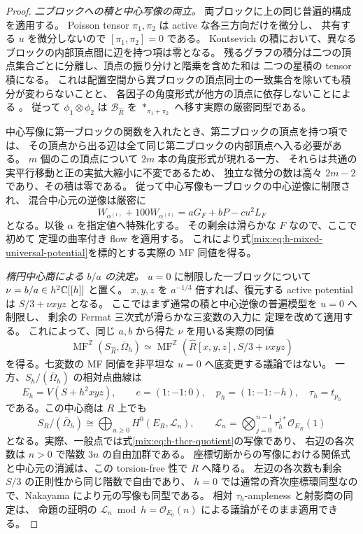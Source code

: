 \begin{proof}
\emph{二ブロックへの積と中心写像の両立。}
両ブロックに上の同じ普遍的構成を適用する。
Poisson tensor $\pi_1,\pi_2$ は active な各三方向だけを微分し、
共有する $u$ を微分しないので $[\pi_1,\pi_2]=0$ である。
Kontsevich の積において、異なるブロックの内部頂点間に辺を持つ項は零となる。
残るグラフの積分は二つの頂点集合ごとに分離し、頂点の振り分けと階乗を含めた和は
二つの星積の tensor 積になる。
これは配置空間から異ブロックの頂点同士の一致集合を除いても積分が変わらないことと、
各因子の角度形式が他方の頂点に依存しないことによる
\cite[Sections~6.2--6.4]{PKontsevich}。
従って $\phi_1\otimes\phi_2$ は $\mathscr B_{\widehat R}$ を
$*_{\pi_1+\pi_2}$ へ移す実際の厳密同型である。

中心写像に第一ブロックの関数を入れたとき、第二ブロックの頂点を持つ項では、
その頂点から出る辺は全て同じ第二ブロックの内部頂点へ入る必要がある。
$m$ 個のこの頂点について $2m$ 本の角度形式が現れる一方、
それらは共通の実平行移動と正の実拡大縮小に不変であるため、
独立な微分の数は高々 $2m-2$ であり、その積は零である。
従って中心写像も一ブロックの中心逆像に制限され、
混合中心元の逆像は厳密に
\begin{equation}\label{mix:eq:h-mixed-universal-potential}
 W_{\alpha^{(1)}}+100W_{\alpha^{(2)}}
   =aG_F+bP-c u^2L_F
\end{equation}
となる。以後 $\alpha$ を指定値へ特殊化する。
その剰余は滑らかな $F$ なので、ここで初めて
定理の曲率付き flow を適用する。
これにより式\eqref{mix:eq:h-mixed-universal-potential}を標的とする実際の MF 同値を得る。

\emph{楕円中心商による $b/a$ の決定。}
$u=0$ に制限した一ブロックについて
$\nu=b/a\in h^2\mathbb C[[h]]$ と置く。
$x,y,z$ を $a^{-1/3}$ 倍すれば、復元する active potential は $S/3+\nu xyz$ となる。
ここではまず通常の積と中心逆像の普遍模型を $u=0$ へ制限し、
剰余の Fermat 三次式が滑らかな三変数の入力に
定理を改めて適用する。
これによって、同じ $a,b$ から得た $\nu$ を用いる実際の同値
\[
 \operatorname{MF}^{\mathbb Z}(S_{\widehat R},\overline\Omega_h)
 \simeq
 \operatorname{MF}^{\mathbb Z}(\widehat R[x,y,z],S/3+\nu xyz)
\]
を得る。七変数の MF 同値を非平坦な $u=0$ へ底変更する議論ではない。
一方、$S_h/(\overline\Omega_h)$ の相対点曲線は
\[
 E_h=V(S+h^2xyz),\qquad
 e=(1:-1:0),\quad p_h=(1:-1:-h),\quad\tau_h=t_{p_h}
\]
である。この中心商は $R$ 上でも
\[
 S_R/(\overline\Omega_h)
 \cong\bigoplus_{n\ge0}H^0(E_R,\mathcal L_n),\qquad
 \mathcal L_n=\bigotimes_{j=0}^{n-1}\tau_h^{j*}\mathcal O_{E_R}(1)
\]
となる。実際、一般点では式\eqref{mix:eq:h-thcr-quotient}の写像であり、
右辺の各次数は $n>0$ で階数 $3n$ の自由加群である。
座標切断からの写像における関係式と中心元の消滅は、この torsion-free 性で $R$ へ降りる。
左辺の各次数も剰余 $S/3$ の正則性から同じ階数で自由であり、
$h=0$ では通常の斉次座標環同型なので、Nakayama により元の写像も同型である。
相対 $\tau_h$-ampleness と射影商の同定は、
命題の証明の
$\mathcal L_n\bmod h=\mathcal O_{E_0}(n)$ による議論がそのまま適用できる。


\end{proof}
